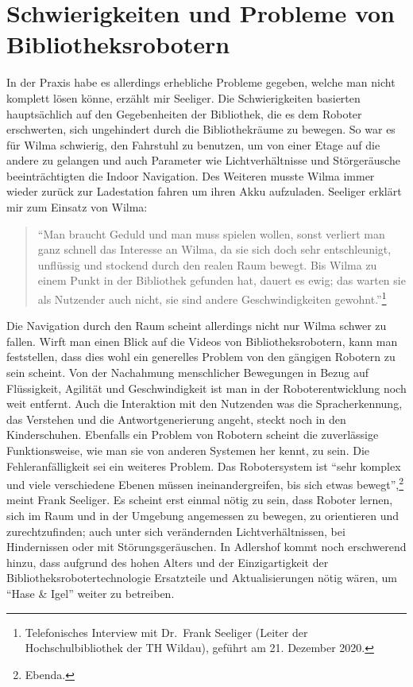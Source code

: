 \documentclass[a4paper,
fontsize=11pt,
oneside,
numbers=noperiodatend,
parskip=half-,
bibliography=totoc,
final
]{scrartcl}
\begin{document}
\hypertarget{schwierigkeiten-und-probleme-von-bibliotheksrobotern}{%
\section{Schwierigkeiten und Probleme von
Bibliotheksrobotern}\label{schwierigkeiten-und-probleme-von-bibliotheksrobotern}}

In der Praxis habe es allerdings erhebliche Probleme gegeben, welche man
nicht komplett lösen könne, erzählt mir Seeliger. Die Schwierigkeiten
basierten hauptsächlich auf den Gegebenheiten der Bibliothek, die es dem
Roboter erschwerten, sich ungehindert durch die Bibliothekräume zu
bewegen. So war es für Wilma schwierig, den Fahrstuhl zu benutzen, um
von einer Etage auf die andere zu gelangen und auch Parameter wie
Lichtverhältnisse und Störgeräusche beeinträchtigten die Indoor
Navigation. Des Weiteren musste Wilma immer wieder zurück zur
Ladestation fahren um ihren Akku aufzuladen. Seeliger erklärt mir zum
Einsatz von Wilma:

\begin{quote}
\enquote{Man braucht Geduld und man muss spielen wollen, sonst verliert
man ganz schnell das Interesse an Wilma, da sie sich doch sehr
entschleunigt, unflüssig und stockend durch den realen Raum bewegt. Bis
Wilma zu einem Punkt in der Bibliothek gefunden hat, dauert es ewig; das
warten sie als Nutzender auch nicht, sie sind andere Geschwindigkeiten
gewohnt.}\footnote{Telefonisches Interview mit Dr.~Frank Seeliger
  (Leiter der Hochschulbibliothek der TH Wildau), geführt am 21.
  Dezember 2020.}
\end{quote}

Die Navigation durch den Raum scheint allerdings nicht nur Wilma schwer
zu fallen. Wirft man einen Blick auf die Videos von Bibliotheksrobotern,
kann man feststellen, dass dies wohl ein generelles Problem von den
gängigen Robotern zu sein scheint. Von der Nachahmung menschlicher
Bewegungen in Bezug auf Flüssigkeit, Agilität und Geschwindigkeit ist
man in der Roboterentwicklung noch weit entfernt. Auch die Interaktion
mit den Nutzenden was die Spracherkennung, das Verstehen und die
Antwortgenerierung angeht, steckt noch in den Kinderschuhen. Ebenfalls
ein Problem von Robotern scheint die zuverlässige Funktionsweise, wie
man sie von anderen Systemen her kennt, zu sein. Die Fehleranfälligkeit
sei ein weiteres Problem. Das Robotersystem ist \enquote{sehr komplex
und viele verschiedene Ebenen müssen ineinandergreifen, bis sich etwas
bewegt},\footnote{Ebenda.} meint Frank Seeliger. Es scheint erst einmal
nötig zu sein, dass Roboter lernen, sich im Raum und in der Umgebung
angemessen zu bewegen, zu orientieren und zurechtzufinden; auch unter
sich verändernden Lichtverhältnissen, bei Hindernissen oder mit
Störungsgeräuschen. In Adlershof kommt noch erschwerend hinzu, dass
aufgrund des hohen Alters und der Einzigartigkeit der
Bibliotheksrobotertechnologie Ersatzteile und Aktualisierungen nötig
wären, um \enquote{Hase \& Igel} weiter zu betreiben.
\end{document}
